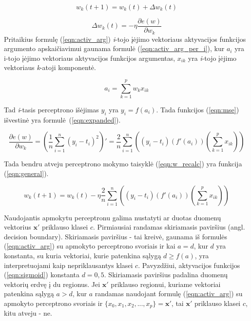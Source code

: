 \begin{equation}
	\label{eqn:w_recalc}
	w_k(t + 1) = w_k(t) + \Delta w_k(t)
\end{equation}

\begin{equation}
	\label{eqn:w_change}
	\Delta w_k(t) = - \eta \dfrac{\partial e(w)}{\partial w_k}
\end{equation}
Pritaikius formulę (\ref{eqn:activ_arg}) \textit{i}-tojo įėjimo vektoriaus aktyvacijos funkcijos argumento apskaičiavimui gaunama formulė (\ref{eqn:activ_arg_per_i}), kur $a_i$ yra i-tojo įėjimo vektoriaus aktyvacijos funkcijos argumentas, $x_{ik}$ yra \textit{i}-tojo įėjimo vektoriaus \textit{k}-atoji komponentė.

\begin{equation}
	\label{eqn:activ_arg_per_i}
	a_i = \sum_{k = 1}^{p} w_{k}x_{ik}
\end{equation}

Tad \textit{i}-tasis perceptrono išėjimas $y_i$ yra $y_i = f(a_i)$. Tada funkcijos (\ref{eqn:mse}) išvestinė yra formulė~(\ref{eqn:expanded}).

\begin{equation}
	\label{eqn:expanded}
	\dfrac{\partial e(w)}{\partial w_k} = (\dfrac{1}{n}\sum_{i=1}^{n} (y_i - t_i)^2)'
		= \dfrac{2}{n}\sum_{i=1}^{n}
			((y_i - t_i)(f'(a_i))(\sum_{k = 1}^{p} x_{ik}))
\end{equation}

Tada bendru atveju perceptrono mokymo taisyklė (\ref{eqn:w_recalc}) yra funkcija (\ref{eqn:general}).

\begin{equation}
	\label{eqn:general}
	w_k(t + 1) = w_k(t) - \eta \dfrac{2}{n}\sum_{i=1}^{n} ((y_i - t_i)(f'(a_i))(\sum_{k = 1}^{p} x_{ik}))
\end{equation}

Naudojantis apmokytu perceptronu galima nustatyti ar duotas duomenų vektorius $\boldsymbol{x}'$ priklauso klasei $c$. Pirmiausiai randamas skiriamasis paviršius (angl. decision boundary). Skiriamasis paviršius - tai kreivė, gaunama iš formulės (\ref{eqn:activ_arg}) su apmokyto perceptrono svoriais ir kai $a = d$, kur $d$ yra konstanta, su kuria vektoriai, kurie patenkina sąlygą $d \ge f(a)$, yra interpretuojami kaip nepriklausantys klasei $c$. Pavyzdžiui, aktyvacijos funkcijos (\ref{eqn:sigmoid}) konstanta $d = 0,5$. Skiriamasis paviršius padalina duomenų vektorių erdvę į du regionus. Jei $\boldsymbol{x}'$ priklauso regionui, kuriame vektoriai patenkina sąlygą $a > d$, kur $a$ randamas naudojant formulę (\ref{eqn:activ_arg}) su apmokyto perceptrono svoriais ir $\{x_{0}, x_{1}, x_{2}, ..., x_{p}\} = \boldsymbol{x}'$, tai $\boldsymbol{x}'$ priklauso klasei $c$, kitu atveju - ne.